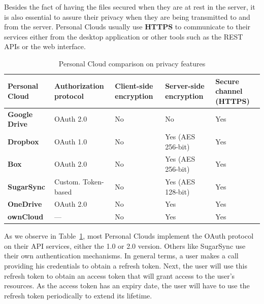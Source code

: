 Besides the fact of having the files secured when they are at rest in the server, it is also essential to assure their privacy when they are being transmitted to and from the server. Personal Clouds usually use \textbf{HTTPS} to communicate to their services either from the desktop application or other tools such as the REST APIs or the web interface.


{
\def\arraystretch{1.5}

\begin{table}
\begin{center}
    \begin{tabular}{ | p{3.3cm} | p{2.5cm} | p{2.2cm} | p{2.2cm} | p{2cm} | }
    \hline
    \rowcolor[gray]{0.8}

	\textbf{Personal Cloud} &
	\textbf{Authorization protocol} &
	\textbf{Client-side encryption} &
	\textbf{Server-side encryption} & 
	\textbf{Secure channel (HTTPS)} \\ \hline
	
	\textbf{Google Drive} &
	OAuth 2.0 &
	No &
	No &
	Yes \\ \hline

	\textbf{Dropbox} &
	OAuth 1.0 &
	No &
	Yes (AES 256-bit) &
	Yes \\ \hline
	
	\textbf{Box} &
	OAuth 2.0 &
	No &
	Yes (AES 256-bit) &
	Yes \\ \hline
	
	\textbf{SugarSync} & 
	Custom. Token-based &
	No &
	Yes (AES 128-bit) &
	Yes \\ \hline
	
	\textbf{OneDrive} & 
	OAuth 2.0 &
	No &
	Yes &
	Yes \\ \hline

	
	\textbf{ownCloud} &
	--- &
	No &
	Yes &
	Yes \\ \hline

    \end{tabular}
    \caption{Personal Cloud comparison on privacy features}
    \label{tab:pc_privacy}
\end{center}
\end{table}
}

As we observe in Table~\ref{tab:pc_privacy}, most Personal Clouds implement the OAuth protocol on their API services, either the 1.0 or 2.0 version. Others like SugarSync use their own authentication mechanisms. In general terms, a user makes a call providing his credentials to obtain a refresh token. Next, the user will use this refresh token to obtain an access token that will grant access to the user's resources. As the access token has an expiry date, the user will have to use the refresh token periodically to extend its lifetime.

